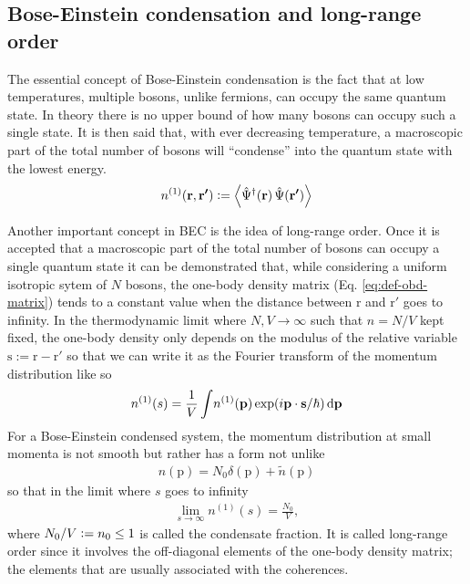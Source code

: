 \documentclass[12pt,a4paper]{book}
\renewcommand{\vec}[1]{\bm{\mathrm{#1}}}
\begin{document}
		\subsection{Bose-Einstein condensation and long-range order}
			The essential concept of Bose-Einstein condensation is the fact that at low temperatures, multiple bosons, unlike fermions, can occupy the same quantum state. In theory there is no upper bound of how many bosons can occupy such a single state. It is then said that, with ever decreasing temperature, a macroscopic part of the total number of bosons will ``condense'' into the quantum state with the lowest energy.\\			
			\begin{align}
				n^{(1)}(\vec{r},\vec{r'}) \vcentcolon= \expectationvalue{\hat{\Psi}^\dagger(\vec{r})\,\hat{\Psi}(\vec{r'})}\label{eq:def-obd-matrix}
			\end{align}
			
			Another important concept in BEC is the idea of long-range order. Once it is accepted that a macroscopic part of the total number of bosons can occupy a single quantum state it can be demonstrated that, while considering a uniform isotropic sytem of $N$ bosons, the one-body density matrix (Eq. \ref{eq:def-obd-matrix}) tends to a constant value when the distance between $\vec{r}$ and $\vec{r}'$ goes to infinity. In the thermodynamic limit where $N,V\rightarrow\infty$ such that $n=N/V$ kept fixed, the one-body density only depends on the modulus of the relative variable $\vec{s}:=\vec{r}-\vec{r}'$ so that we can write it as the Fourier transform of the momentum distribution like so
			\begin{align}
				n^{(1)}(s) = \frac{1}{V}\int \! n^{(1)}\qty(\vec{p})\exp(i\vec{p}\cdot\vec{s}/\hbar)\,\mathrm{d}\vec{p}
			\end{align}
			For a Bose-Einstein condensed system, the momentum distribution at small momenta is not smooth but rather has a form not unlike
			\begin{align}
				n(\vec{p})=N_0\delta(\vec{p})+\tilde{n}(\vec{p})
			\end{align}
			so that in the limit where $s$ goes to infinity
			\begin{align}
				\lim_{s\rightarrow\infty}n^{(1)}(s)=\frac{N_0}{V},
			\end{align}
			where $N_0/V \vcentcolon= n_0\leq 1$ is called the condensate fraction. It is called long-range order since it involves the off-diagonal elements of the one-body density matrix; the elements that are usually associated with the coherences.\\
			
\end{document}
